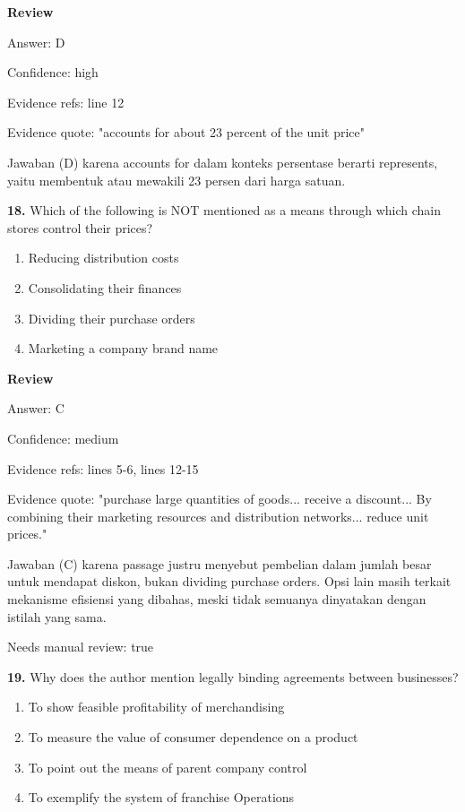 \documentclass[12pt]{article}
\begin{document}
\par
\begingroup
\setlength{\parskip}{0pt}
\setlength{\parindent}{0pt}
\textbf{Review}\par
Answer: D\par
Confidence: high\par
Evidence refs: line 12\par
Evidence quote: "accounts for about 23 percent of the unit price"\par
Jawaban (D) karena accounts for dalam konteks persentase berarti represents, yaitu membentuk atau mewakili 23 persen dari harga satuan.\par
\endgroup
\par
\vspace{0.25\baselineskip}
\noindent\textbf{18.} Which of the following is NOT mentioned as a means through which chain stores control their prices?
\begin{enumerate}[label=(\Alph*),leftmargin=*,itemsep=0.2em]
\item Reducing distribution costs
\item Consolidating their finances
\item Dividing their purchase orders
\item Marketing a company brand name
\end{enumerate}
\par
\begingroup
\setlength{\parskip}{0pt}
\setlength{\parindent}{0pt}
\textbf{Review}\par
Answer: C\par
Confidence: medium\par
Evidence refs: lines 5-6, lines 12-15\par
Evidence quote: "purchase large quantities of goods... receive a discount... By combining their marketing resources and distribution networks... reduce unit prices."\par
Jawaban (C) karena passage justru menyebut pembelian dalam jumlah besar untuk mendapat diskon, bukan dividing purchase orders. Opsi lain masih terkait mekanisme efisiensi yang dibahas, meski tidak semuanya dinyatakan dengan istilah yang sama.\par
Needs manual review: true\par
\endgroup
\par
\vspace{0.25\baselineskip}
\noindent\textbf{19.} Why does the author mention legally binding agreements between businesses?
\begin{enumerate}[label=(\Alph*),leftmargin=*,itemsep=0.2em]
\item To show feasible profitability of merchandising
\item To measure the value of consumer dependence on a product
\item To point out the means of parent company control
\item To exemplify the system of franchise Operations
\end{enumerate}
\end{document}
